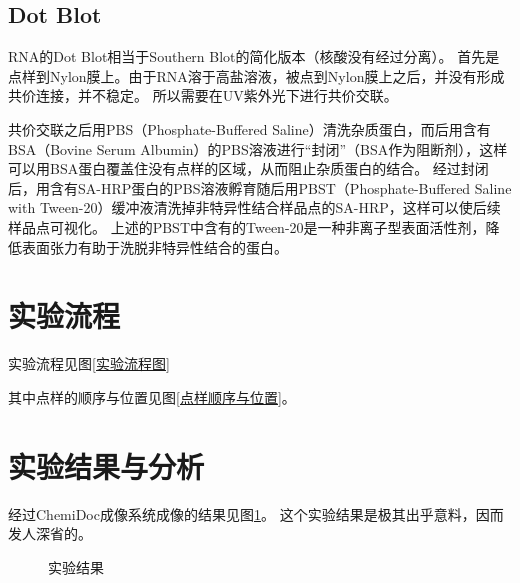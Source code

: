 \documentclass[UTF-8]{ctexart}
\begin{document}
\subsection{Dot Blot}
RNA的Dot Blot相当于Southern Blot的简化版本（核酸没有经过分离）。
首先是点样到Nylon膜上。由于RNA溶于高盐溶液，被点到Nylon膜上之后，并没有形成共价连接，并不稳定。
所以需要在UV紫外光下进行共价交联。

共价交联之后用PBS（Phosphate-Buffered Saline）清洗杂质蛋白，而后用含有BSA（Bovine Serum Albumin）的PBS溶液进行“封闭”（BSA作为阻断剂），这样可以用BSA蛋白覆盖住没有点样的区域，从而阻止杂质蛋白的结合。
经过封闭后，用含有SA-HRP蛋白的PBS溶液孵育随后用PBST（Phosphate-Buffered Saline with Tween-20）缓冲液清洗掉非特异性结合样品点的SA-HRP，这样可以使后续样品点可视化。
上述的PBST中含有的Tween-20是一种非离子型表面活性剂，降低表面张力有助于洗脱非特异性结合的蛋白。

\section{实验流程}
实验流程见图\ref{实验流程图}


其中点样的顺序与位置见图\ref{点样顺序与位置}。

\section{实验结果与分析}
经过ChemiDoc成像系统成像的结果见图\ref{实验结果}。
这个实验结果是极其出乎意料，因而发人深省的。

\begin{figure}[h]
    \centering
    \caption{实验结果}  
    \label{实验结果}
 \end{figure}
\end{document}
